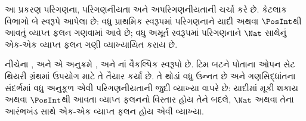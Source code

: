 \documentclass[../../../include/open-logic-chapter]{subfiles}
\begin{document}

\begin{editorial}
આ પ્રકરણ પરિગણના, પરિગણનીયતા અને અપરિગણનીયતાની ચર્ચા કરે છે.
કેટલાક વિભાગો બે સ્વરૂપે આપેલા છે: વધુ પ્રાથમિક સ્વરૂપમાં
પરિગણનાને યાદી અથવા $\PosInt$થી આવતું વ્યાપ્ત ફલન
ગણવામાં આવે છે; વધુ અમૂર્ત સ્વરૂપમાં પરિગણનાને
$\Nat$ સાથેનું એક-એક વ્યાપ્ત ફલન ગણી વ્યાખ્યાયિત કરાય છે.
\end{editorial}











\begin{editorial}
નીચેના ,
 અને 
એ અનુક્રમે ,
 અને નાં
વૈકલ્પિક સ્વરૂપો છે. ટિમ બટને પોતાના ઓપન સેટ થિયરી
ગ્રંથમાં ઉપયોગ માટે તે તૈયાર કર્યાં છે. તે થોડાં વધુ
ઉન્નત છે અને ગણસિદ્ધાંતના સંદર્ભમાં વધુ અનુકૂળ એવી
પરિગણનીયતાની જુદી વ્યાખ્યા વાપરે છે: યાદીમાં મૂકી શકાય
અથવા $\PosInt$થી આવતા વ્યાપ્ત ફલનનો વિસ્તાર હોય
તેને બદલે, $\Nat$ અથવા તેના આરંભખંડ સાથે એક-એક
વ્યાપ્ત ફલન હોય એવી વ્યાખ્યા.
\end{editorial}


\OLEndChapterHook
\end{document}
